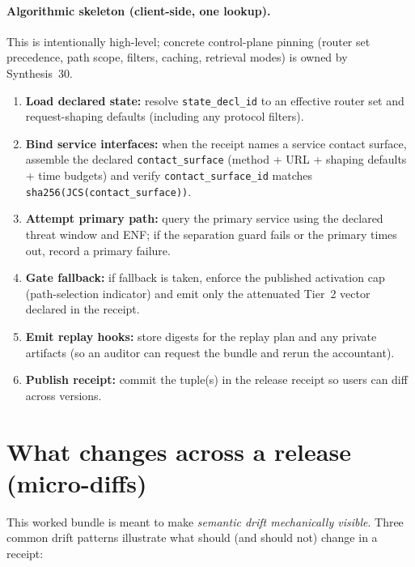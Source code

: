 \documentclass[11pt]{article}
\begin{document}
\paragraph{Algorithmic skeleton (client-side, one lookup).}
This is intentionally high-level; concrete control-plane pinning (router set precedence, path scope, filters, caching, retrieval modes) is owned by Synthesis~30.\cite{series:deployedsurfaces}
\begin{enumerate}[leftmargin=*]
\item \textbf{Load declared state:} resolve \texttt{state\_decl\_id} to an effective router set and request-shaping defaults (including any protocol filters).
\item \textbf{Bind service interfaces:} when the receipt names a service contact surface, assemble the declared \texttt{contact\_surface} (method + URL + shaping defaults + time budgets) and verify \texttt{contact\_surface\_id} matches \texttt{sha256(JCS(contact\_surface))}.\cite{rfc8785}
\item \textbf{Attempt primary path:} query the primary service using the declared threat window and ENF; if the separation guard fails or the primary times out, record a primary failure.
\item \textbf{Gate fallback:} if fallback is taken, enforce the published activation cap (path-selection indicator) and emit only the attenuated Tier~2 vector declared in the receipt.
\item \textbf{Emit replay hooks:} store digests for the replay plan and any private artifacts (so an auditor can request the bundle and rerun the accountant).
\item \textbf{Publish receipt:} commit the tuple(s) in the release receipt so users can diff across versions.\end{enumerate}
\section{What changes across a release (micro-diffs)}

This worked bundle is meant to make \emph{semantic drift mechanically visible}.
Three common drift patterns illustrate what should (and should not) change in a receipt:
\end{document}

